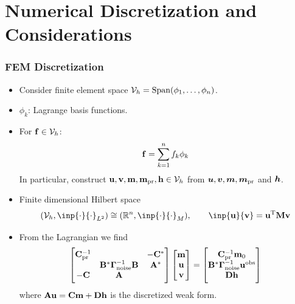 \documentclass[
  pdf,
  10pt,
  xcolor={svgnames},
]{beamer}
\newcommand{\mc}[1]{\mathcal{#1}}
\newcommand{\R}{\mathbb{R}}
\newcommand{\T}{\mathrm{T}}
\renewcommand{\vec}[1]{{\mathchoice
                     {\mbox{\boldmath$\displaystyle{#1}$}}
                     {\mbox{\boldmath$\textstyle{#1}$}}
                     {\mbox{\boldmath$\scriptstyle{#1}$}}
                     {\mbox{\boldmath$\scriptscriptstyle{#1}$}}}}
\newcommand{\mat}[1]{\mathbf{{#1}}}
\newcommand{\obs}{\mathbf{u}^{\rm obs}}
\begin{document}
\section{Numerical Discretization and Considerations}
\begin{frame}
  \frametitle{FEM Discretization}
  \begin{itemize}
    \item Consider finite element space $\mc{V}_h = {\rm Span}(\phi_1, \dots,
      \phi_n)$.
    \item $\phi_k$: Lagrange basis functions. 
    \item For $\vb{f} \in \mc{V}_h$:
      \[
        \vb{f} = \sum_{k=1}^n f_k \phi_k
      \]
    In particular, construct $\vb{u}, \vb{v}, \vb{m}, \vb{m}_{\rm pr},
      \vb{h} \in \mc{V}_h$ from $\vec{u}, \vec{v}, \vec{m}, \vec{m}_{\rm pr}$
      and $\vec{h}$.
    \item Finite dimensional Hilbert space 
      \[
        (\mc{V}_h, \inp{\cdot}{\cdot}_{L^2})
        \cong 
        (\R^n, \inp{\cdot}{\cdot}_M),
        \qquad \inp{\vb{u}}{\vb{v}} = \vb{u}^\T \mat{M} \vb{v}
      \]
    \item From the Lagrangian we find
      \[
        \begin{bmatrix}
          \mat{C}_{\rm pr}^{-1} & & -\mat{C}^* \\
          & \mat{B}^* \vb{\Gamma}_{\rm noise}^{-1} \mat{B} & \mat{A}^* \\
          -\mat{C} & \mat{A} & 
        \end{bmatrix}
        \begin{bmatrix} \vb{m} \\ \vb{u} \\ \vb{v} \end{bmatrix}
        = \begin{bmatrix}
          \mat{C}_{\rm pr}^{-1} \vb{m}_0 \\ 
          \mat{B}^* \vb{\Gamma}_{\rm noise}^{-1} \obs \\
          \mat{D} \vb{h}
        \end{bmatrix}
      \]
      where $\mat{A} \vb{u} = \mat{C} \vb{m} + \mat{D} \vb{h}$ is the discretized
      weak form.
  \end{itemize}
\end{frame}
\end{document}
